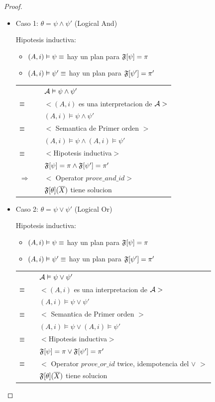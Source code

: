 \begin{proof}
\begin{itemize}
\begin{itemize}
				\item Caso 1: $\theta = \psi \land \psi'$ (Logical And)
					  
					  Hipotesis inductiva:
					 	\begin{itemize}
					 		\item $(A,i) \vDash \psi \equiv$ hay un plan para $\mathfrak{F}[\psi] = \pi$
							\item $(A,i) \vDash \psi' \equiv$ hay un plan para $\mathfrak{F}[\psi'] = \pi'$
					 	\end{itemize}
				
					\begin{tabular}{@{}p{1mm}p{1mm}p{11cm}}	
					 	& & $\mathcal{A} \vDash \psi \land \psi'$\\
						$\equiv$ & & $<(A,i)$ es una interpretacion de $\mathcal{A}>$ \\
						& & $(A,i) \models \psi \land \psi'$ \\
						$\equiv$ & & $<$ Semantica de Primer orden $>$\\
						& & $(A,i) \models \psi \land (A,i) \models \psi'$ \\
						$\equiv$ & & $<$Hipotesis inductiva$>$\\
						& & $\mathfrak{F}[\psi] = \pi \land \mathfrak{F}[\psi'] = \pi'$\\
						$\Rightarrow$ & & $<$ Operator $ prove\_and\_id >$\\
						& & $\mathfrak{F}[\theta](\overline{X})$ tiene solucion
					\end{tabular}
				\item Caso 2: $\theta = \psi \lor \psi'$ (Logical Or)
					  
					  Hipotesis inductiva:
					 	\begin{itemize}
					 		\item $(A,i) \vDash \psi \equiv$ hay un plan para $\mathfrak{F}[\psi] = \pi$
							\item $(A,i) \vDash \psi' \equiv$ hay un plan para $\mathfrak{F}[\psi'] = \pi'$
					 	\end{itemize}
				
					\begin{tabular}{@{}p{1mm}p{1mm}p{11cm}}	
					 	& & $\mathcal{A} \vDash \psi \lor \psi'$\\
						$\equiv$ & & $<(A,i)$ es una interpretacion de $\mathcal{A}>$ \\
						& & $(A,i) \models \psi \lor \psi'$ \\
						$\equiv$ & & $<$ Semantica de Primer orden $>$\\
						& & $(A,i) \models \psi \lor (A,i) \models \psi'$ \\
						$\equiv$ & & $<$Hipotesis inductiva$>$\\
						& & $\mathfrak{F}[\psi] = \pi \lor \mathfrak{F}[\psi'] = \pi'$\\
						$\equiv$ & & $<$ Operator $ prove\_or\_id$ twice, idempotencia del $\lor$ $>$\\
						& & $\mathfrak{F}[\theta](\overline{X})$ tiene solucion
					\end{tabular}
					

\end{itemize}
\end{itemize}
\end{proof}
